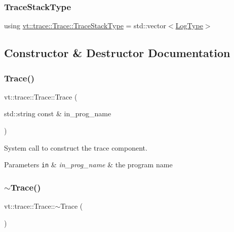 \subsubsection{\texorpdfstring{Trace\+Stack\+Type}{TraceStackType}}
{\footnotesize\ttfamily using \hyperlink{structvt_1_1trace_1_1_trace_af27d223028d10a196680513defcef3d6}{vt\+::trace\+::\+Trace\+::\+Trace\+Stack\+Type} =  std\+::vector$<$\hyperlink{structvt_1_1trace_1_1_trace_a43306d96a91e49db081eaea016f1dd0a}{Log\+Type}$>$}



\subsection{Constructor \& Destructor Documentation}
\mbox{\label{structvt_1_1trace_1_1_trace_a2b736f560ee446cbd84aaf96e25c8d0b}} 
\subsubsection{\texorpdfstring{Trace()}{Trace()}}
{\footnotesize\ttfamily vt\+::trace\+::\+Trace\+::\+Trace (\begin{DoxyParamCaption}\item[{std\+::string const \&}]{in\+\_\+prog\+\_\+name }\end{DoxyParamCaption})}



System call to construct the trace component. 


\begin{DoxyParams}[1]{Parameters}
\mbox{\tt in}  & {\em in\+\_\+prog\+\_\+name} & the program name \\
\hline
\end{DoxyParams}
\mbox{\label{structvt_1_1trace_1_1_trace_a80b3426aed07572525ef4834b0c4dedd}} 
\subsubsection{\texorpdfstring{$\sim$\+Trace()}{~Trace()}}
{\footnotesize\ttfamily vt\+::trace\+::\+Trace\+::$\sim$\+Trace (\begin{DoxyParamCaption}{ }\end{DoxyParamCaption})\hspace{0.3cm}{\ttfamily [virtual]}}



